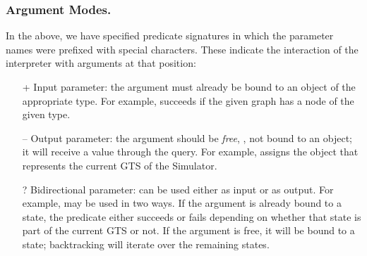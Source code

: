 \subsubsection{Argument Modes.} In the above, we have specified predicate
signatures in which the parameter names were prefixed with special characters.
These indicate the interaction of the \Prolog interpreter with arguments at
that position:
\begin{itemize}\noitemsep
\item[\textsf{+}] Input parameter: the argument must already be bound to an
  object of the appropriate type. For example,
   succeeds if the given graph has a node
  of the given type.
\item[\textsf{--}] Output parameter: the argument should be \emph{free}, \ie,
  not bound to an object; it will receive a value through the query. For
  example,  assigns the object that represents the current
  GTS of the Simulator.
\item[\textsf{?}] Bidirectional parameter: can be used either as input or as
  output. For example,  may be used in two ways.  If the
  argument is already bound to a state, the predicate either succeeds or fails
  depending on whether that state is part of the current GTS or not.  If the
  argument is free, it will be bound to a state; backtracking will iterate
  over the remaining states.
\end{itemize}


